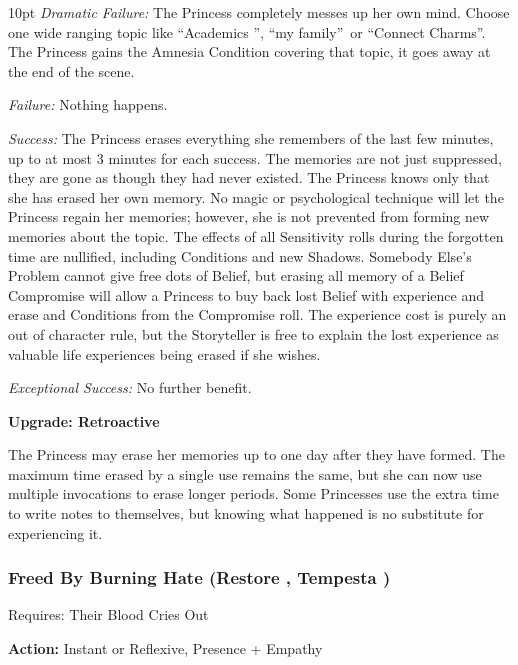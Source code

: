 \begin{myindentpar}{10pt}    \emph{Dramatic Failure:} The Princess completely messes up her own mind. Choose one wide ranging topic like \textquotedblleft Academics \textquotedblright , \textquotedblleft my family\textquotedblright\, or \textquotedblleft Connect Charms\textquotedblright . The Princess gains the Amnesia Condition covering that topic, it goes away at the end of the scene.

    \emph{Failure:} Nothing happens.

    \emph{Success:} The Princess erases everything she remembers of the last few minutes, up to at most 3 minutes for each success. The memories are not just suppressed, they are gone as though they had never existed. The Princess knows only that she has erased her own memory. No magic or psychological technique will let the Princess regain her memories; however, she is not prevented from forming new memories about the topic.
    The effects of all Sensitivity rolls during the forgotten time are nullified, including Conditions and new Shadows. Somebody Else's Problem cannot give free dots of Belief, but erasing all memory of a Belief Compromise will allow a Princess to buy back lost Belief with experience and erase and Conditions from the Compromise roll. The experience cost is purely an out of character rule, but the Storyteller is free to explain the lost experience as valuable life experiences being erased if she wishes.

    \emph{Exceptional Success:} No further benefit.

\textbf{Upgrade: Retroactive}

The Princess may erase her memories up to one day after they have formed. The maximum time erased by a single use remains the same, but she can now use multiple invocations to erase longer periods. Some Princesses use the extra time to write notes to themselves, but knowing what happened is no substitute for experiencing it.\end{myindentpar}

\subsubsection*{Freed By Burning Hate (Restore \textbullet\textbullet\textbullet, Tempesta \textbullet\textbullet\textbullet)}

\noindent Requires: Their Blood Cries Out

\noindent \textbf{Action:} Instant or Reflexive, Presence + Empathy

